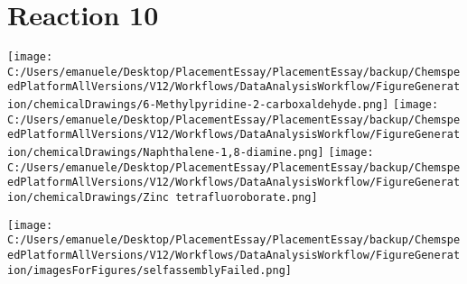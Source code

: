 \documentclass{article}%
\begin{document}
\section*{Reaction 10}%
%
\begin{scheme}[H]%
\begin{minipage}{0.5\textwidth}%
\texttt{[image: C:/Users/emanuele/Desktop/PlacementEssay/PlacementEssay/backup/ChemspeedPlatformAllVersions/V12/Workflows/DataAnalysisWorkflow/FigureGeneration/chemicalDrawings/6-Methylpyridine-2-carboxaldehyde.png]}%
\texttt{[image: C:/Users/emanuele/Desktop/PlacementEssay/PlacementEssay/backup/ChemspeedPlatformAllVersions/V12/Workflows/DataAnalysisWorkflow/FigureGeneration/chemicalDrawings/Naphthalene-1,8-diamine.png]}%
\texttt{[image: C:/Users/emanuele/Desktop/PlacementEssay/PlacementEssay/backup/ChemspeedPlatformAllVersions/V12/Workflows/DataAnalysisWorkflow/FigureGeneration/chemicalDrawings/Zinc tetrafluoroborate.png]}%
\end{minipage}%
\begin{minipage}{0.5\textwidth}%
\begin{center}%
\texttt{[image: C:/Users/emanuele/Desktop/PlacementEssay/PlacementEssay/backup/ChemspeedPlatformAllVersions/V12/Workflows/DataAnalysisWorkflow/FigureGeneration/imagesForFigures/selfassemblyFailed.png]}%
\end{center}%
\end{minipage}%
\caption{Self-assembly of components 8, 21, with Zinc(II) in a 3.0:1.5:1.0 molar ratio in CH$_3$CN at 60\textdegree C for 40h. These are the reagents (starting materials) for reaction 10.}%
\end{scheme}%
\end{document}
